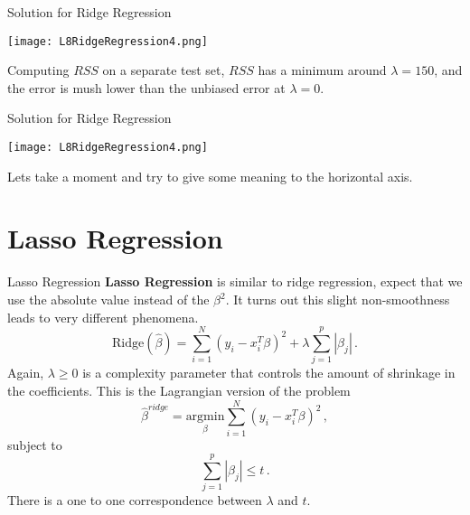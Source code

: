 \documentclass[10pt, table, dvipsnames,xcdraw,handout]{beamer}
\begin{document}
\begin{frame}[fragile]{Solution for Ridge Regression} 
  \begin{minipage}[t][0.7\textheight][t]{\textwidth}
	\centering \texttt{[image: L8RidgeRegression4.png]} 
  \end{minipage}
  \vfill
\begin{minipage}[t][0.3\textheight][t]{\textwidth}
Computing $RSS$ on a separate test set, $RSS$ has a minimum around $\lambda = 150$, and the error is mush lower than the unbiased error at $\lambda=0$. 
\end{minipage}
\end{frame}



\begin{frame}[fragile]{Solution for Ridge Regression} 
  \begin{minipage}[t][0.7\textheight][t]{\textwidth}
	\centering \texttt{[image: L8RidgeRegression4.png]} 
  \end{minipage}
  \vfill
\begin{minipage}[t][0.3\textheight][t]{\textwidth}
Lets take a moment and try to give some meaning to the horizontal axis. 
\end{minipage}
\end{frame}



\section{Lasso Regression}



\begin{frame}[fragile]{Lasso Regression} 
\textbf{Lasso Regression} is similar to ridge regression, expect that we use the absolute value instead of the $\beta^2$. It turns out this slight non-smoothness leads to very different phenomena.
$$
\text{Ridge}(\hat \beta) = \sum_{i=1}^N(y_i - x_i^T\beta)^2 +\lambda \sum_{j=1}^p|\beta_j|\,.
$$\pause
Again, $\lambda\geq 0$ is a complexity parameter that controls the amount of shrinkage in the coefficients. \pause This is the Lagrangian version of the problem
$$
\hat \beta^{ridge} =  \underset{\beta}{\text{argmin}} \sum_{i=1}^N(y_i - x_i^T\beta)^2\,,
$$
subject to 
$$
\sum_{j=1}^p|\beta_j| \leq t\,.
$$
There is a one to one correspondence between $\lambda$ and $t$.

\end{frame}
\end{document}
